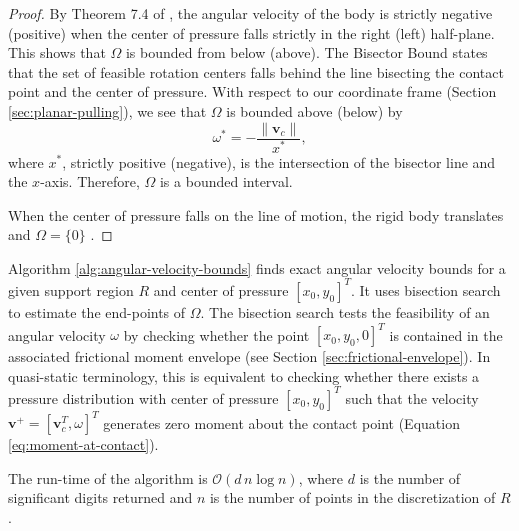 \documentclass[conference]{IEEEtran}
\begin{document}
\begin{proof}
  By Theorem 7.4 of \cite{Mason}, the angular velocity of the body is
  strictly negative (positive) when the center of pressure falls
  strictly in the right (left) half-plane. This shows that $\Omega$ is
  bounded from below (above). The Bisector Bound \cite{Mason} states
  that the set of feasible rotation centers falls behind the line
  bisecting the contact point and the center of pressure. With respect
  to our coordinate frame (Section \ref{sec:planar-pulling}), we see
  that $\Omega$ is bounded above (below) by 
  \begin{equation}
    \omega^* = -\frac{\lVert\mathbf{v}_c\rVert}{x^*},
  \end{equation}
  where $x^*$, strictly positive (negative), is the intersection of
  the bisector line and the $x$-axis. Therefore, $\Omega$ is a
  bounded interval.

  When the center of pressure falls on the line of motion, the rigid
  body translates and $\Omega = \{0\}$ \cite{Mason}.
\end{proof}

Algorithm \ref{alg:angular-velocity-bounds} finds exact angular
velocity bounds for a given support region $R$ and center of pressure
$[x_0,y_0]^T$. It uses bisection search to estimate the end-points of
$\Omega$. The bisection search tests the feasibility of an angular
velocity $\omega$ by checking whether the point $[x_0,y_0,0]^T$ is
contained in the associated frictional moment envelope (see Section
\ref{sec:frictional-envelope}). In quasi-static terminology, this is
equivalent to checking whether there exists a pressure distribution
with center of pressure $[x_0,y_0]^T$ such that the velocity
$\mathbf{v}^+ = [\mathbf{v}_c^T, \omega]^T$ generates zero moment
about the contact point (Equation \ref{eq:moment-at-contact}).

The run-time of the algorithm is $\mathcal{O}(d\,n\log{} n)$, where
$d$ is the number of significant digits returned and $n$ is the number
of points in the discretization of $R$.
\end{document}

